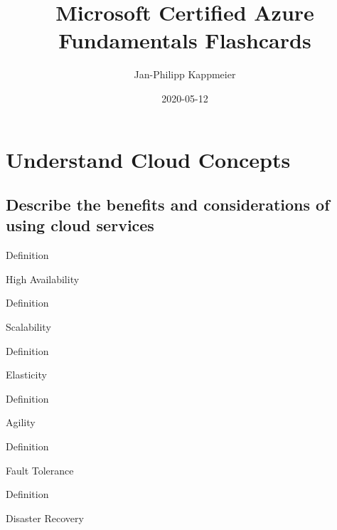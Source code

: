 \documentclass{scrartcl}
\newenvironment{flashcard}[2][]{%
    #1
    \vfill
    \centerline{\Large{#2}}
    \vfill
    \newpage
}
{\newpage}
\newcommand{\sectioncard}[1]{
    \vspace*{\stretch{1}}
    \section{#1}
    \vspace*{\stretch{1}}
    \pagebreak
}
\newcommand{\subsectioncard}[1]{
    \vspace*{\stretch{1}}
    \subsection{#1}
    \vspace*{\stretch{1}}
    \pagebreak
}
\begin{document}
    \title{Microsoft Certified Azure Fundamentals Flashcards}
    \date{2020-05-12}
    \author{Jan-Philipp Kappmeier}

    \clearpage\maketitle
    \thispagestyle{empty}
    \pagebreak

    \sectioncard{Understand Cloud Concepts}

    \subsectioncard{Describe the benefits and considerations of using cloud services}

    \begin{flashcard}[Definition]{High Availability}

    \end{flashcard}

    \begin{flashcard}[Definition]{Scalability}

    \end{flashcard}

    \begin{flashcard}[Definition]{Elasticity}

    \end{flashcard}

    \begin{flashcard}[Definition]{Agility}

    \end{flashcard}

    \begin{flashcard}[Definition]{Fault Tolerance}

    \end{flashcard}

    \begin{flashcard}[Definition]{Disaster Recovery}

    \end{flashcard}
\end{document}
